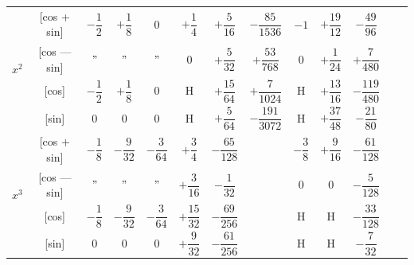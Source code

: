 \documentclass[11pt,a4paper]{book}
\begin{document}
{{\begin{center}
\begin{tabular}{|c|c|c|c|c|c|c|c|c|c|c|c|c|}
\hline
\multirow{4}{*}{$x^2$} & [cos + sin] & $-\dfrac{1}{2}$ & $+\dfrac{1}{8}$ & $0$ & $+\dfrac{1}{4}$ & $+\dfrac{5}{16}$ & $-\dfrac{85}{1536}$ & $-1$ & $+\dfrac{19}{12}$ & $-\dfrac{49}{96}$ \\
& [cos --- sin] & $"$ & $"$ & $"$ & $0$ & $+\dfrac{5}{32}$ & $+\dfrac{53}{768}$ & $0$ & $+\dfrac{1}{24}$ & $+\dfrac{7}{480}$ \\
& [cos] & $-\dfrac{1}{2}$ & $+\dfrac{1}{8}$ & $0$ & H & $+\dfrac{15}{64}$ & $+\dfrac{7}{1024}$ & H & $+\dfrac{13}{16}$ & $-\dfrac{119}{480}$ \\
& [sin] & $0$ & $0$ & $0$ & H & $+\dfrac{5}{64}$ & $-\dfrac{191}{3072}$ & H & $+\dfrac{37}{48}$ & $-\dfrac{21}{80}$ \\
\hline
\multirow{4}{*}{$x^3$} & [cos + sin] & $-\dfrac{1}{8}$ & $-\dfrac{9}{32}$ & $-\dfrac{3}{64}$ & $+\dfrac{3}{4}$ & $-\dfrac{65}{128}$ & & $-\dfrac{3}{8}$ & $+\dfrac{9}{16}$ & $-\dfrac{61}{128}$ \\
& [cos --- sin] & $"$ & $"$ & $"$ & $+\dfrac{3}{16}$ & $-\dfrac{1}{32}$ & & $0$ & $0$ & $-\dfrac{5}{128}$ \\
& [cos] & $-\dfrac{1}{8}$ & $-\dfrac{9}{32}$ & $-\dfrac{3}{64}$ & $+\dfrac{15}{32}$ & $-\dfrac{69}{256}$ & & H & H & $-\dfrac{33}{128}$ \\
& [sin] & $0$ & $0$ & $0$ & $+\dfrac{9}{32}$ & $-\dfrac{61}{256}$ & & H & H & $-\dfrac{7}{32}$ \\
\hline
\end{tabular}
\end{center}

\newpage
{}

}}
\end{document}
